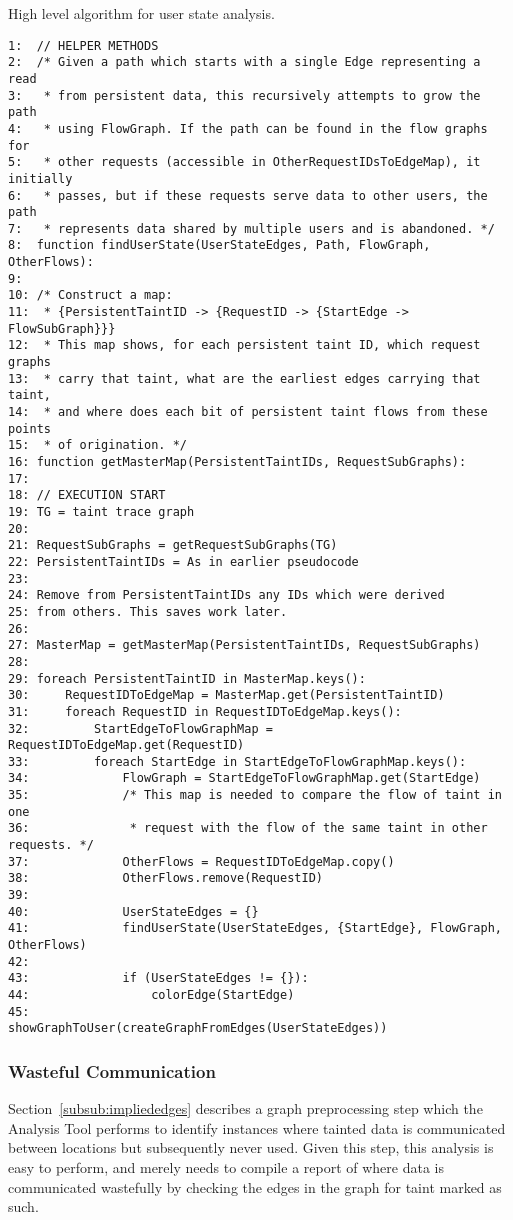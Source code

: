 \documentclass[msc,oneside]{ubcthesis}
\begin{document}
\begin{Program}
  \caption{\label{prog:code5} High level algorithm for user state analysis.}
\begin{verbatim}
1:	// HELPER METHODS
2:	/* Given a path which starts with a single Edge representing a read 
3:	 * from persistent data, this recursively attempts to grow the path
4:	 * using FlowGraph. If the path can be found in the flow graphs for
5:	 * other requests (accessible in OtherRequestIDsToEdgeMap), it initially 
6:	 * passes, but if these requests serve data to other users, the path
7:	 * represents data shared by multiple users and is abandoned. */
8:	function findUserState(UserStateEdges, Path, FlowGraph, OtherFlows):
9:	
10:	/* Construct a map: 
11:	 * {PersistentTaintID -> {RequestID -> {StartEdge -> FlowSubGraph}}}
12:	 * This map shows, for each persistent taint ID, which request graphs 
13:	 * carry that taint, what are the earliest edges carrying that taint,
14:	 * and where does each bit of persistent taint flows from these points 
15:	 * of origination. */
16:	function getMasterMap(PersistentTaintIDs, RequestSubGraphs):
17:	
18:	// EXECUTION START
19:	TG = taint trace graph
20:	
21:	RequestSubGraphs = getRequestSubGraphs(TG)
22:	PersistentTaintIDs = As in earlier pseudocode
23:	
24:	Remove from PersistentTaintIDs any IDs which were derived
25:	from others. This saves work later.
26:	
27:	MasterMap = getMasterMap(PersistentTaintIDs, RequestSubGraphs)
28:	
29:	foreach PersistentTaintID in MasterMap.keys():
30:	    RequestIDToEdgeMap = MasterMap.get(PersistentTaintID)
31:	    foreach RequestID in RequestIDToEdgeMap.keys():
32:	        StartEdgeToFlowGraphMap = RequestIDToEdgeMap.get(RequestID) 
33:	        foreach StartEdge in StartEdgeToFlowGraphMap.keys():
34:	            FlowGraph = StartEdgeToFlowGraphMap.get(StartEdge)
35:	            /* This map is needed to compare the flow of taint in one
36:	             * request with the flow of the same taint in other requests. */
37:	            OtherFlows = RequestIDToEdgeMap.copy()
38:	            OtherFlows.remove(RequestID)
39:	            
40:	            UserStateEdges = {}
41:	            findUserState(UserStateEdges, {StartEdge}, FlowGraph, OtherFlows)
42:	            
43:	            if (UserStateEdges != {}):
44:	                colorEdge(StartEdge)
45:	                showGraphToUser(createGraphFromEdges(UserStateEdges))      
\end{verbatim}
\end{Program}

\subsubsection{Wasteful Communication}
Section~\ref{subsub:impliededges} describes a graph preprocessing step which the Analysis Tool performs to identify instances where tainted data is communicated between locations but subsequently never used. Given this step, this analysis is easy to perform, and merely needs to compile a report of where data is communicated wastefully by checking the edges in the graph for taint marked as such. \\
\end{document}
